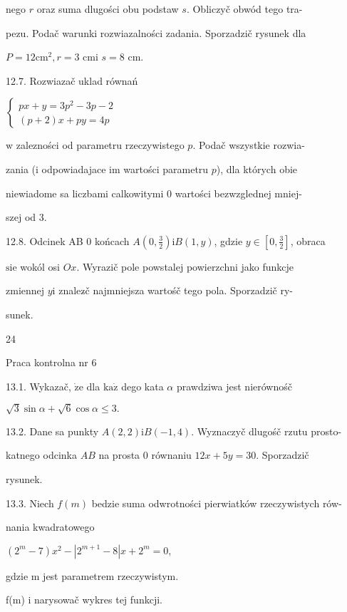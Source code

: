 \documentclass[a4paper,12pt]{article}
\begin{document}
nego $r$ oraz suma dlugości obu podstaw $s$. Obliczyč obwód tego tra-

pezu. Podač warunki rozwiazalności zadania. Sporzadzič rysunek dla

$P=12\mathrm{c}\mathrm{m}^{2}, r=3$ cmi $s=8$ cm.

12.7. Rozwiazač uklad równań

$\left\{\begin{array}{l}
px+y=3p^{2}-3p-2\\
(p+2)x+py=4p
\end{array}\right.$

$\mathrm{w}$ zalezności od parametru rzeczywistego $p$. Podač wszystkie rozwia-

zania ($\mathrm{i}$ odpowiadajace im wartości parametru $p$), dla których obie

niewiadome sa liczbami calkowitymi $0$ wartości bezwzglednej mniej-

szej od 3.

12.8. Odcinek AB $0$ końcach $A(0,\displaystyle \frac{3}{2}) \mathrm{i}B(1,y)$, gdzie $ y\in [0,\displaystyle \frac{3}{2}]$, obraca

$\mathrm{s}\mathrm{i}\mathrm{e}$ wokól osi $Ox$. Wyrazič pole powstalej powierzchni jako funkcje

zmiennej $y\mathrm{i}$ znalez$\acute{}$č najmniejsza wartośč tego pola. Sporzadzič ry-

sunek.





24

Praca kontrolna nr 6

13.1. Wykazač, $\dot{\mathrm{z}}\mathrm{e}$ dla $\mathrm{k}\mathrm{a}\dot{\mathrm{z}}$ dego kata $\alpha$ prawdziwa jest nierównośč

$\sqrt{3}\sin\alpha+\sqrt{6}\cos\alpha\leq 3.$

13.2. Dane sa punkty $A(2,2)\mathrm{i}B(-1,4)$. Wyznaczyč dlugośč rzutu prosto-

katnego odcinka $AB$ na prosta $0$ równaniu $12x+5y=30$. Sporzadzič

rysunek.

13.3. Niech $f(m)$ bedzie suma odwrotności pierwiatków rzeczywistych rów-

nania kwadratowego

$(2^{m}-7)x^{2}-|2^{m+1}-8|x+2^{m}=0,$

gdzie m jest parametrem rzeczywistym.

f(m) i narysowač wykres tej funkcji.
\end{document}
